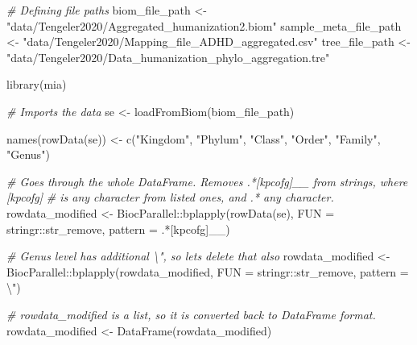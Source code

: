 \documentclass[
  oneside]{book}
\newenvironment{Shaded}{\begin{snugshade}}{\end{snugshade}}
\newcommand{\AttributeTok}[1]{\textcolor[rgb]{0.77,0.63,0.00}{#1}}
\newcommand{\CommentTok}[1]{\textcolor[rgb]{0.56,0.35,0.01}{\textit{#1}}}
\newcommand{\FunctionTok}[1]{\textcolor[rgb]{0.00,0.00,0.00}{#1}}
\newcommand{\NormalTok}[1]{#1}
\newcommand{\OtherTok}[1]{\textcolor[rgb]{0.56,0.35,0.01}{#1}}
\newcommand{\SpecialCharTok}[1]{\textcolor[rgb]{0.00,0.00,0.00}{#1}}
\newcommand{\StringTok}[1]{\textcolor[rgb]{0.31,0.60,0.02}{#1}}
\begin{document}
\begin{Shaded}
\begin{Highlighting}[]
\CommentTok{\# Defining file paths}
\NormalTok{biom\_file\_path }\OtherTok{\textless{}{-}} \StringTok{"data/Tengeler2020/Aggregated\_humanization2.biom"}
\NormalTok{sample\_meta\_file\_path }\OtherTok{\textless{}{-}} \StringTok{"data/Tengeler2020/Mapping\_file\_ADHD\_aggregated.csv"}
\NormalTok{tree\_file\_path }\OtherTok{\textless{}{-}} \StringTok{"data/Tengeler2020/Data\_humanization\_phylo\_aggregation.tre"}

\FunctionTok{library}\NormalTok{(mia)}

\CommentTok{\# Imports the data}
\NormalTok{se }\OtherTok{\textless{}{-}} \FunctionTok{loadFromBiom}\NormalTok{(biom\_file\_path)}


\FunctionTok{names}\NormalTok{(}\FunctionTok{rowData}\NormalTok{(se)) }\OtherTok{\textless{}{-}} \FunctionTok{c}\NormalTok{(}\StringTok{"Kingdom"}\NormalTok{, }\StringTok{"Phylum"}\NormalTok{, }\StringTok{"Class"}\NormalTok{, }\StringTok{"Order"}\NormalTok{, }
                        \StringTok{"Family"}\NormalTok{, }\StringTok{"Genus"}\NormalTok{)}

\CommentTok{\# Goes through the whole DataFrame. Removes \textquotesingle{}.*[kpcofg]\_\_\textquotesingle{} from strings, where [kpcofg] }
\CommentTok{\# is any character from listed ones, and .* any character.}
\NormalTok{rowdata\_modified }\OtherTok{\textless{}{-}}\NormalTok{ BiocParallel}\SpecialCharTok{::}\FunctionTok{bplapply}\NormalTok{(}\FunctionTok{rowData}\NormalTok{(se), }
                                           \AttributeTok{FUN =}\NormalTok{ stringr}\SpecialCharTok{::}\NormalTok{str\_remove, }
                                           \AttributeTok{pattern =} \StringTok{\textquotesingle{}.*[kpcofg]\_\_\textquotesingle{}}\NormalTok{)}

\CommentTok{\# Genus level has additional \textquotesingle{}\textbackslash{}"\textquotesingle{}, so let\textquotesingle{}s delete that also}
\NormalTok{rowdata\_modified }\OtherTok{\textless{}{-}}\NormalTok{ BiocParallel}\SpecialCharTok{::}\FunctionTok{bplapply}\NormalTok{(rowdata\_modified, }
                                           \AttributeTok{FUN =}\NormalTok{ stringr}\SpecialCharTok{::}\NormalTok{str\_remove, }
                                           \AttributeTok{pattern =} \StringTok{\textquotesingle{}}\SpecialCharTok{\textbackslash{}"}\StringTok{\textquotesingle{}}\NormalTok{)}

\CommentTok{\# rowdata\_modified is a list, so it is converted back to DataFrame format. }
\NormalTok{rowdata\_modified }\OtherTok{\textless{}{-}} \FunctionTok{DataFrame}\NormalTok{(rowdata\_modified)}


\end{Highlighting}
\end{Shaded}
\end{document}
